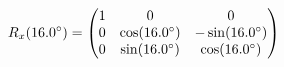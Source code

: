 \documentclass[preview]{standalone}
\begin{document}
\begin{align*}
\special{dvisvgm:raw <g id='unique000'>}R_x(16.0^\circ) = \begin{pmatrix} 1 & 0 & 0 \\ 0 & \cos(16.0^\circ) & -\sin(16.0^\circ) \\ 0 & \sin(16.0^\circ) & \cos(16.0^\circ) \end{pmatrix}\special{dvisvgm:raw </g>}
\end{align*}
\end{document}
